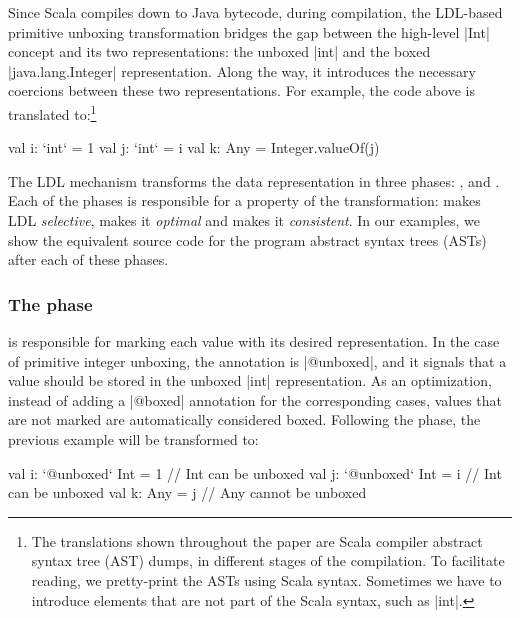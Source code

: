 Since Scala compiles down to Java bytecode, during compilation, the LDL-based primitive unboxing transformation bridges the gap between the high-level |Int| concept and its two representations: the unboxed |int| and the boxed |java.lang.Integer| representation. Along the way, it introduces the necessary coercions between these two representations. For example, the code above is translated to:\footnote{The translations shown throughout the paper are Scala compiler abstract syntax tree (AST) dumps, in different stages of the compilation. To facilitate reading, we pretty-print the ASTs using Scala syntax. Sometimes we have to introduce elements that are not part of the Scala syntax, such as |int|.}

\begin{lstlisting-nobreak}
val i: `int` = 1
val j: `int` = i
val k: Any = Integer.valueOf(j)
\end{lstlisting-nobreak}

The LDL mechanism transforms the data representation in three phases:
\inject{}, \coerce{} and \commit{}. Each of the phases is responsible
for a property of the transformation: \inject{} makes LDL
\emph{selective}, \coerce{} makes it \emph{optimal} and \commit{}
makes it \emph{consistent}. In our examples, we show the equivalent
source code for the program abstract syntax trees (ASTs) after each of
these phases.

\vspace{-0.2em}
\subsubsection{The \inject{} phase} is responsible for marking each value with its desired representation. In the case of primitive integer unboxing, the annotation is |@unboxed|, and it signals that a value should be stored in the unboxed |int| representation. As an optimization, instead of adding a |@boxed| annotation for the corresponding cases, values that are not marked are automatically considered boxed. Following the \inject{} phase, the previous example will be transformed to:

\vspace{-0.1em}
\begin{lstlisting-nobreak}
val i: `@unboxed` Int = 1 // Int can be unboxed
val j: `@unboxed` Int = i // Int can be unboxed
val k: Any = j                  // Any cannot be unboxed
\end{lstlisting-nobreak}


